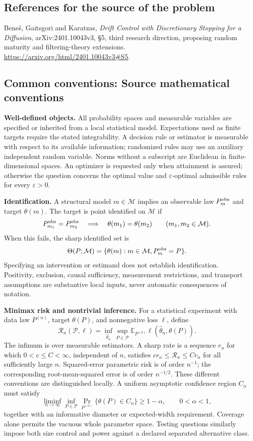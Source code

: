 \documentclass[11pt,a4paper]{article}
\newcommand{\E}{\mathbb E}
\begin{document}
\subsection*{References for the source of the problem}
Bene\v{s}, Gaitsgori and Karatzas, \emph{Drift Control with Discretionary
Stopping for a Diffusion}, arXiv:2401.10043v3, \S5, third research
direction, proposing random maturity and filtering-theory extensions.
\url{https://arxiv.org/html/2401.10043v3#S5}.

\subsection*{Common conventions: Source mathematical conventions}

\textbf{Well-defined objects.}
All probability spaces and measurable variables are specified or inherited
from a local statistical model. Expectations used as finite targets require
the stated integrability. A decision rule or estimator is measurable with
respect to its available information; randomized rules may use an auxiliary
independent random variable. Norms without a subscript are Euclidean in
finite-dimensional spaces. An optimizer is requested only when attainment
is assured; otherwise the question concerns the optimal value and
$\varepsilon$-optimal admissible rules for every $\varepsilon>0$.

\textbf{Identification.}
A structural model $m\in\mathcal M$ implies an observable law
$P_m^{\rm obs}$ and target $\theta(m)$. The target is point identified on
$\mathcal M$ if
\[
 P_{m_1}^{\rm obs}=P_{m_2}^{\rm obs}
 \quad\Longrightarrow\quad\theta(m_1)=\theta(m_2)
 \qquad(m_1,m_2\in\mathcal M).
\]
When this fails, the sharp identified set is
\[
 \Theta(P;\mathcal M)=\{\theta(m):m\in\mathcal M,
                                  P_m^{\rm obs}=P\}.
\]
Specifying an intervention or estimand does not establish identification.
Positivity, exclusion, causal sufficiency, measurement restrictions, and
transport assumptions are substantive local inputs, never automatic
consequences of notation.

\textbf{Minimax risk and nontrivial inference.}
For a statistical experiment with data law $P^{(n)}$, target $\theta(P)$,
and nonnegative loss $\ell$, define
\[
 \mathcal R_n(\mathcal P,\ell)
   =\inf_{\widehat\theta_n}\sup_{P\in\mathcal P}
      \E_{P^{(n)}}\ell(\widehat\theta_n,\theta(P)).
\]
The infimum is over measurable estimators. A sharp rate is a sequence
$r_n$ for which $0<c\leq C<\infty$, independent of $n$, satisfies
$c r_n\leq\mathcal R_n\leq C r_n$ for all sufficiently large $n$.
Squared-error parametric risk is of order $n^{-1}$; the corresponding
root-mean-squared error is of order $n^{-1/2}$. These different conventions
are distinguished locally. A uniform asymptotic confidence region $C_n$
must satisfy
\[
 \liminf_{n\to\infty}\inf_{P\in\mathcal P}
     \Pr_{P^{(n)}}\{\theta(P)\in C_n\}\geq 1-\alpha,
 \qquad 0<\alpha<1,
\]
together with an informative diameter or expected-width requirement.
Coverage alone permits the vacuous whole parameter space. Testing questions
similarly impose both size control and power against a declared separated
alternative class.
\end{document}
